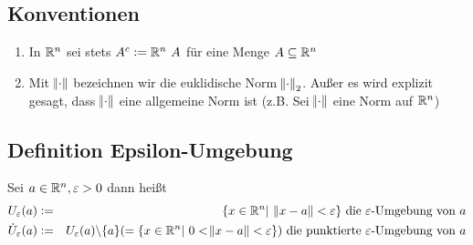 \subsection{Konventionen}
\begin{enumerate}[label= (\alph*)]
    \item In $\mathbb{R}^n$ sei stets $A^c := \mathbb{R}^n \ A$ für eine Menge $A \subseteq \mathbb{R}^n$
    \item Mit $\norm{\cdot}$ bezeichnen wir die euklidische Norm $\norm{\cdot}_2$.
    Außer es wird explizit gesagt, dass $\norm{\cdot}$ eine allgemeine Norm ist
    (z.B. \glqq{} Sei $\norm{\cdot}$ eine Norm   auf $\mathbb{R}^n$)
\end{enumerate}

\subsection{Definition Epsilon-Umgebung}
Sei $a \in \mathbb{R}^n, \varepsilon > 0$ dann heißt
\begin{eqnarray*}
    U_\varepsilon(a) &:=& \{ x \in \mathbb{R}^n |\ \norm{x-a} < \varepsilon \} \text{ die }
    \varepsilon \text{-Umgebung von }a\\
    \dot{U}_\varepsilon(a) &:=& U_\varepsilon(a) \backslash \{a \}
    ( =\{ x \in \mathbb{R}^n |\ 0<\norm{x-a}<\varepsilon \} ) \text{ die punktierte }
    \varepsilon \text{-Umgebung von }a
\end{eqnarray*}


